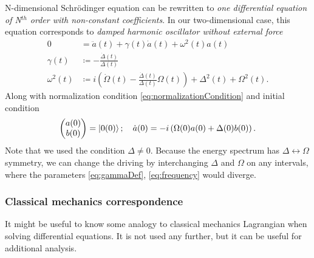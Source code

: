 N-dimensional Schr\"odinger equation can be rewritten to \emph{one differential equation of N$^{th}$ order with non-constant coefficients}. In our two-dimensional case, this equation corresponds to \emph{damped harmonic oscillator without external force}
\begin{align}
    0&= \ddot a(t)+ \gamma(t) \dot a(t)+\omega^2(t)a(t) \label{eq:harmonicOscillator}\\
    \gamma(t)&\coloneqq -\frac{\dot \Delta(t)}{\Delta(t)} \label{eq:gammaDef}\\
    \omega^2(t) &\coloneqq i\left(\dot \Omega(t)-\frac{\dot\Delta(t)}{\Delta(t)}\Omega(t)\right)+\Delta^2(t)+\Omega^2(t).
    \label{eq:frequency}
\end{align}
Along with normalization condition \ref{eq:normalizationCondition} and initial condition
\begin{equation}
    \begin{pmatrix}
        a(0)\\b(0)
    \end{pmatrix}=\ket{0(0)}; \quad \dot a(0)=-i\left(\Omega(0) a(0)+\Delta(0)b(0)\right).
\end{equation}
Note that we used the condition $\Delta\neq 0$. Because the energy spectrum has $\Delta\leftrightarrow \Omega$ symmetry, we can change the driving by interchanging $\Delta$ and $\Omega$ on any intervals, where the parameters \ref{eq:gammaDef}, \ref{eq:frequency} would diverge.


\subsubsection{Classical mechanics correspondence}
It might be useful to know some analogy to classical mechanics Lagrangian when solving differential equations. It is not used any further, but it can be useful for additional analysis.

